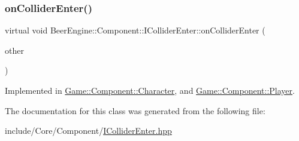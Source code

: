\subsubsection{\texorpdfstring{on\+Collider\+Enter()}{onColliderEnter()}}
{\footnotesize\ttfamily virtual void Beer\+Engine\+::\+Component\+::\+I\+Collider\+Enter\+::on\+Collider\+Enter (\begin{DoxyParamCaption}\item[{\mbox{\hyperlink{class_beer_engine_1_1_component_1_1_a_collider}{A\+Collider}} $\ast$}]{other }\end{DoxyParamCaption})\hspace{0.3cm}{\ttfamily [pure virtual]}}



Implemented in \mbox{\hyperlink{class_game_1_1_component_1_1_character_abf25f82178afa36cf7fcf148877fad24}{Game\+::\+Component\+::\+Character}}, and \mbox{\hyperlink{class_game_1_1_component_1_1_player_a68981bff23caf1fa65ea9a9007265b54}{Game\+::\+Component\+::\+Player}}.



The documentation for this class was generated from the following file\+:\begin{DoxyCompactItemize}
\item 
include/\+Core/\+Component/\mbox{\hyperlink{_i_collider_enter_8hpp}{I\+Collider\+Enter.\+hpp}}\end{DoxyCompactItemize}
